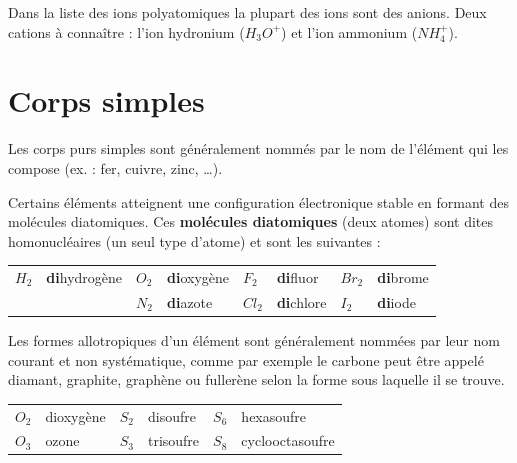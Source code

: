 \documentclass[
  11pt,
  a4paper,
  openany]{book}
\begin{document}
Dans la liste des ions polyatomiques la plupart des ions sont des anions. Deux cations à connaître : l'ion hydronium (\(H_3O^+\)) et l'ion ammonium (\(NH_4^+\)).

\section{Corps simples}\label{corps-simples}

Les corps purs simples sont généralement nommés par le nom de l'élément qui les compose (ex. : fer, cuivre, zinc, \ldots).

Certains éléments atteignent une configuration électronique stable en formant des molécules diatomiques. Ces \textbf{molécules diatomiques} (deux atomes) sont dites homonucléaires (un seul type d'atome) et sont les suivantes :

\begin{longtable}[]{@{}
  >{\centering\arraybackslash}p{}
  >{\raggedright\arraybackslash}p{}
  >{\centering\arraybackslash}p{}
  >{\raggedright\arraybackslash}p{}
  >{\centering\arraybackslash}p{}
  >{\raggedright\arraybackslash}p{}
  >{\centering\arraybackslash}p{}
  >{\raggedright\arraybackslash}p{}@{}}
\toprule\noalign{}
\endhead
\bottomrule\noalign{}
\endlastfoot
\(H_2\) & \textbf{di}hydrogène & \(O_2\) & \textbf{di}oxygène & \(F_2\) & \textbf{di}fluor & \(Br_2\) & \textbf{di}brome \\
& & \(N_2\) & \textbf{di}azote & \(Cl_2\) & \textbf{di}chlore & \(I_2\) & \textbf{di}iode \\
\end{longtable}

Les formes allotropiques d'un élément sont généralement nommées par leur nom courant et non systématique, comme par exemple le carbone peut être appelé diamant, graphite, graphène ou fullerène selon la forme sous laquelle il se trouve.

\begin{longtable}[]{@{}clclcl@{}}
\toprule\noalign{}
\endhead
\bottomrule\noalign{}
\endlastfoot
\(O_2\) & dioxygène & \(S_2\) & disoufre & \(S_6\) & hexasoufre \\
\(O_3\) & ozone & \(S_3\) & trisoufre & \(S_8\) & cyclooctasoufre \\
\end{longtable}
\end{document}
